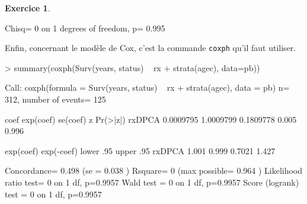 \documentclass[11pt]{report}
\theoremstyle{definition}
\newtheorem{exo}{Exercice}[chapter]
\begin{document}
\begin{exo}
\begin{sol}
\begin{Schunk}
\begin{Soutput}
 Chisq= 0  on 1 degrees of freedom, p= 0.995 
\end{Soutput}
\end{Schunk}

Enfin, concernant le modèle de Cox, c'est la commande \texttt{coxph} qu'il
faut utiliser.
\begin{Schunk}
\begin{Sinput}
> summary(coxph(Surv(years, status) ~ rx + strata(agec), data=pb))
\end{Sinput}
\begin{Soutput}
Call:
coxph(formula = Surv(years, status) ~ rx + strata(agec), data = pb)
  n= 312, number of events= 125 

            coef exp(coef)  se(coef)     z Pr(>|z|)
rxDPCA 0.0009795 1.0009799 0.1809778 0.005    0.996

       exp(coef) exp(-coef) lower .95 upper .95
rxDPCA     1.001      0.999    0.7021     1.427

Concordance= 0.498  (se = 0.038 )
Rsquare= 0   (max possible= 0.964 )
Likelihood ratio test= 0  on 1 df,   p=0.9957
Wald test            = 0  on 1 df,   p=0.9957
Score (logrank) test = 0  on 1 df,   p=0.9957
\end{Soutput}
\end{Schunk}
\end{sol}
%
%
\end{exo}
\end{document}
